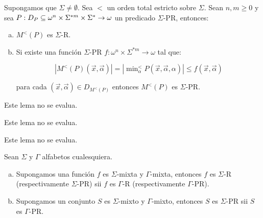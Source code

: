   \begin{lemma}
    \par Supongamos que $\Sigma \neq \emptyset$. Sea $<$ un orden total estricto sobre $\Sigma$. Sean $n, m \geq 0$ y
    sea $P: D_{P} \subseteq \omega^{n} \times \Sigma^{\ast m} \times \Sigma^{\ast} \rightarrow \omega$ un predicado
    $\Sigma$-PR, entonces:

    \begin{enumerate}[a)]
      \item $M^{<}(P)$ es $\Sigma$-R.
      \item Si existe una función $\Sigma$-PR $f: \omega^{n} \times \Sigma^{\ast m} \rightarrow \omega$ tal que:

        \[
          \left\vert M^{<}(P)(\vec{x},\vec{\alpha})\right\vert = \left\vert \min\nolimits_{\alpha}^{<} P(\vec{x},
          \vec{\alpha},\alpha)\right\vert \leq f(\vec{x},\vec{\alpha})
        \]

        \par para cada $(\vec{x},\vec{\alpha}) \in D_{M^{< }(P)}$ entonces $M^{<}(P)$ es $\Sigma$-PR.
    \end{enumerate}
  \end{lemma}

  \begin{lemma}
    \par Este lema no se evalua.
  \end{lemma}

  \begin{lemma}
    \par Este lema no se evalua.
  \end{lemma}

  \begin{lemma}
    \par Este lema no se evalua.
  \end{lemma}

  \begin{theorem}
    \par Sean $\Sigma$ y $\Gamma$ alfabetos cualesquiera.

    \begin{enumerate}[a)]
      \item Supongamos una función $f$ es $\Sigma$-mixta y $\Gamma$-mixta, entonces $f$ es $\Sigma$-R (respectivamente
        $\Sigma$-PR) sii $f$ es $\Gamma$-R (respectivamente $\Gamma$-PR).
      \item Supongamos un conjunto $S$ es $\Sigma$-mixto y $\Gamma$-mixto, entonces $S$ es $\Sigma$-PR sii $S$ es
        $\Gamma$-PR.
    \end{enumerate}
  \end{theorem}
